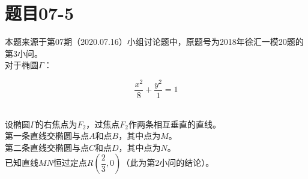 \documentclass[UTF8]{ctexart}
\begin{document}
\newpage

\section{题目07-5}
    本题来源于第07期（2020.07.16）小组讨论题中，原题号为2018年徐汇一模20题的第3小问。\\[3mm]
    对于椭圆$\Gamma$：
    \begin{large}
        \begin{equation*}
            \dfrac{x^2}{8}+\dfrac{y^2}{1}=1
        \end{equation*}
    \end{large}\\
    设椭圆$\Gamma$的右焦点为$F_2$，过焦点$F_2$作两条相互垂直的直线。\\[3mm]
    第一条直线交椭圆与点$A$和点$B$，其中点为$M$。\\[3mm]
    第二条直线交椭圆与点$C$和点$D$，其中点为$N$。\\[3mm]
    已知直线$MN$恒过定点$R\left(\dfrac{2}{3},0\right)$（此为第2小问的结论）。\\[3mm]
\end{document}
